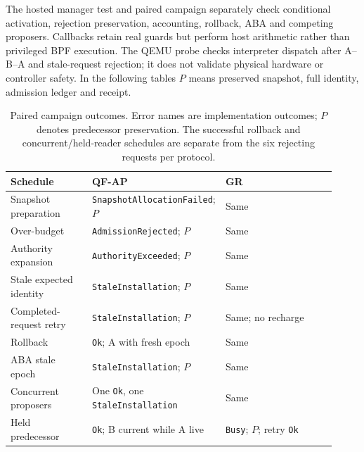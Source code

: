 The hosted manager test and paired campaign separately check conditional activation, rejection preservation, accounting, rollback, ABA and competing proposers. Callbacks retain real guards but perform host arithmetic rather than privileged BPF execution. The QEMU probe checks interpreter dispatch after A--B--A and stale-request rejection; it does not validate physical hardware or controller safety. In the following tables $P$ means preserved snapshot, full identity, admission ledger and receipt.
\begin{table}[!ht]
\caption{Paired campaign outcomes. Error names are implementation outcomes; $P$ denotes predecessor preservation. The successful rollback and concurrent/held-reader schedules are separate from the six rejecting requests per protocol.}
\label{tab:full-faults}
\centering\small
\begin{tabular}{@{}p{0.25\linewidth}p{0.33\linewidth}p{0.34\linewidth}@{}}
\toprule
Schedule & QF-AP & GR\\\midrule
Snapshot preparation & \texttt{SnapshotAllocationFailed}; $P$ & Same\\
Over-budget & \texttt{AdmissionRejected}; $P$ & Same\\
Authority expansion & \texttt{AuthorityExceeded}; $P$ & Same\\
Stale expected identity & \texttt{StaleInstallation}; $P$ & Same\\
Completed-request retry & \texttt{StaleInstallation}; $P$ & Same; no recharge\\
Rollback & \texttt{Ok}; A with fresh epoch & Same\\
ABA stale epoch & \texttt{StaleInstallation}; $P$ & Same\\
Concurrent proposers & One \texttt{Ok}, one \texttt{StaleInstallation} & Same\\
Held predecessor & \texttt{Ok}; B current while A live & \texttt{Busy}; $P$; retry \texttt{Ok}\\
\bottomrule
\end{tabular}
\end{table}

